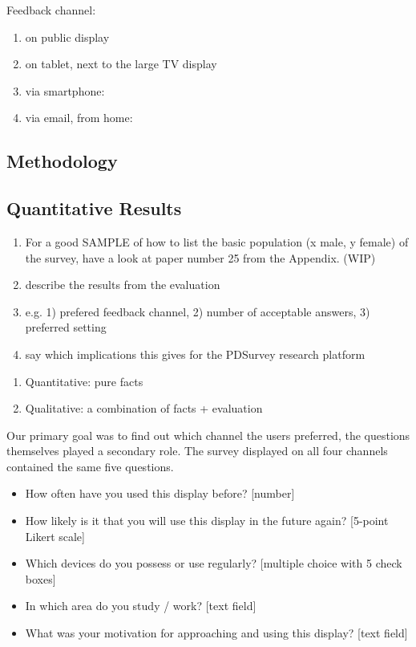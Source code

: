 	Feedback channel: 
	\begin{enumerate}
	\item on public display
	\item on tablet, next to the large TV display
	\item via smartphone: 
	\item via email, from home:
	\end{enumerate}


\subsection{Methodology}



\subsection{Quantitative Results}

	\begin{enumerate}
	\item For a good SAMPLE of how to list the basic population (x male, y female) of the survey, have a look at paper number 25 from the Appendix. (WIP)
	\item describe the results from the evaluation
	\item e.g. 1) prefered feedback channel, 2) number of acceptable answers, 3) preferred setting
	\item say which implications this gives for the PDSurvey research platform
	\end{enumerate}

	\begin{enumerate}
	\item Quantitative: pure facts
	\item Qualitative: a combination of facts + evaluation
	\end{enumerate}


	Our primary goal was to find out which channel the users preferred, the questions themselves played a secondary role. The survey displayed on all four channels contained the same five questions. 

	\begin{itemize}
	\item How often have you used this display before? [number]
	\item How likely is it that you will use this display in the future again? [5-point Likert scale]
	\item Which devices do you possess or use regularly? [multiple choice with 5 check boxes]
	\item In which area do you study / work? [text field]
	\item What was your motivation for approaching and using this display? [text field]
	\end{itemize}

